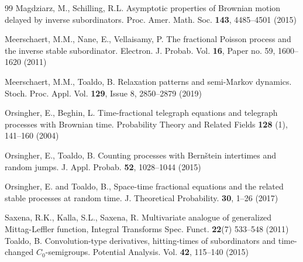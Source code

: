 \documentclass[12pt]{article}
\theoremstyle{definition}
\theoremstyle{plain}
\begin{document}
\begin{thebibliography}{99}
 Magdziarz, M.,  Schilling, R.L. Asymptotic properties of Brownian motion delayed by
inverse subordinators. Proc. Amer. Math. Soc. {\bf 143}, 4485--4501 (2015)

  Meerschaert, M.M., Nane, E., Vellaisamy, P. The fractional Poisson process and the inverse stable subordinator. 
{Electron. J. Probab.}  Vol. {\bf16}, Paper no. 59, 1600--1620 (2011)

  Meerschaert, M.M., Toaldo, B. Relaxation patterns and semi-Markov dynamics. 
{Stoch. Proc. Appl.}  Vol. {\bf129}, Issue 8,  2850--2879 (2019)

  Orsingher, E.,  Beghin, L.
Time-fractional telegraph equations and telegraph processes with Brownian time. 
Probability Theory and Related Fields {\bf128} (1), 141--160 (2004)


 Orsingher, E., Toaldo, B. Counting processes with Bern\v{s}tein intertimes and random jumps. J. Appl. Probab. {\bf52}, 1028--1044 (2015)

 Orsingher, E. and Toaldo, B., Space-time fractional equations and the related stable processes at random time. J. Theoretical Probability.  {\bf 30},  1--26 (2017)
 
  Saxena, R.K.,  Kalla, S.L.,   Saxena, R. Multivariate analogue of generalized Mittag-Leffler function, Integral Transforms Spec. Funct. {\bf 22}(7)  533--548 (2011)
   Toaldo, B. Convolution-type derivatives, hitting-times of subordinators and time-changed $C_0$-semigroups. {Potential Analysis.}   Vol. {\bf42},  115--140 (2015)
 
 
\end{thebibliography}
\end{document}
